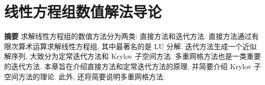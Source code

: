 \section{{线性方程组数值解法导论}}\label{chap:linear-systems-introduction}
\noindent\textbf{{摘要}}\quad
{求解线性方程组的数值方法分为两类: 直接方法和迭代方法. 直接方法通过有限次算术运算求解线性方程组, 其中最著名的是 LU 分解. 迭代方法生成一个近似解序列, 大致分为定常迭代方法和 Krylov 子空间方法. 多重网格方法也是一类重要的迭代方法. 本章旨在介绍直接方法和定常迭代方法的原理, 并简要介绍 Krylov 子空间方法的理论. 此外, 还将简要说明多重网格方法.}
